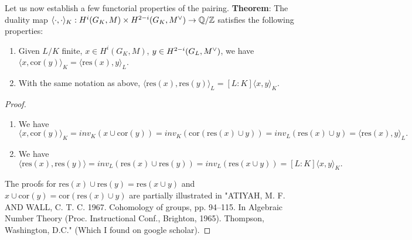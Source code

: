 \documentclass[class=article, crop=false]{standalone}
\begin{document}
Let us now establish a few functorial properties of the pairing.
\vskip 5pt 
\textbf{Theorem}: The duality map $\langle \cdot, \cdot \rangle_K: H^i(G_K,M)\times H^{2-i}(G_K,M^\vee) \to \mathbb{Q}/\mathbb{Z}$ satisfies the following properties:
\begin{enumerate}
    \item Given $L/K$ finite, $x\in H^i(G_K,M)$, $y\in H^{2-i}(G_L, M^\vee)$, we have $\langle x, \text{cor}(y)\rangle_K = \langle \text{res}(x), y\rangle_L$.
    \item With the same notation as above, $\langle \text{res}(x), \text{res}(y)\rangle_L = [L:K]\langle x, y \rangle_K$.
\end{enumerate}
\begin{proof}
\begin{enumerate}
    \item We have \[\langle x, \text{cor}(y)\rangle_K = inv_K(x \cup \text{cor}(y)) = inv_K(\text{cor}(\text{res}(x)\cup y)) = inv_L(\text{res}(x)\cup y) = \langle \text{res}(x),y\rangle_L.\]
    \item We have \[\langle \text{res}(x), \text{res}(y)\rangle= inv_L(\text{res}(x)\cup \text{res}(y)) = inv_L(\text{res}(x\cup y)) = [L:K]\langle x, y \rangle_K.\]
\end{enumerate}
The proofs for $\text{res}(x)\cup \text{res}(y) = \text{res}(x\cup y)$ and $x \cup \text{cor}(y) = \text{cor}(\text{res}(x)\cup y)$ are partially illustrated in "ATIYAH, M. F. AND WALL, C. T. C. 1967. Cohomology of groups, pp. 94–115. In Algebraic Number Theory (Proc. Instructional Conf., Brighton, 1965). Thompson, Washington, D.C." (Which I found on google scholar).
\end{proof}
\end{document}
